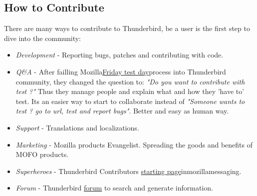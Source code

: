 \subsection{How to Contribute}

There are many ways to contribute to Thunderbird, be a user is the first step to dive into the community:

\begin{itemize}
	\item \textit{Development} - Reporting bugs, patches and contributing with code.
	\item \textit{Q\&A} - After failling Mozilla\href{https://quality.mozilla.org/2013/03/mozilla-org-test-day/}{Friday test day}process into Thunderbird community, they changed the question to: \textit{"Do you want to contribute with test ?"} Thus they manage people and explain what and how they 'have to' test. Its an easier way to start to collaborate instead of \textit{"Someone wants to test ? go to url, test and report bugs"}. Better and easy as human way.
	\item \textit{Support} - Translations and localizations.
	\item \textit{Marketing} - Mozilla products Evangelist. Spreading the goods and benefits of MOFO products.
	\item \textit{Superheroes} - Thunderbird Contributors \href{https://support.mozillamessaging.com/es/kb/buscamos-superhroes}{starting page}inmozillamessaging.
	\item \textit{Forum} - Thunderbird \href{https://getsatisfaction.com/mozilla_messaging/}{forum} to search and generate information.
\end{itemize}

